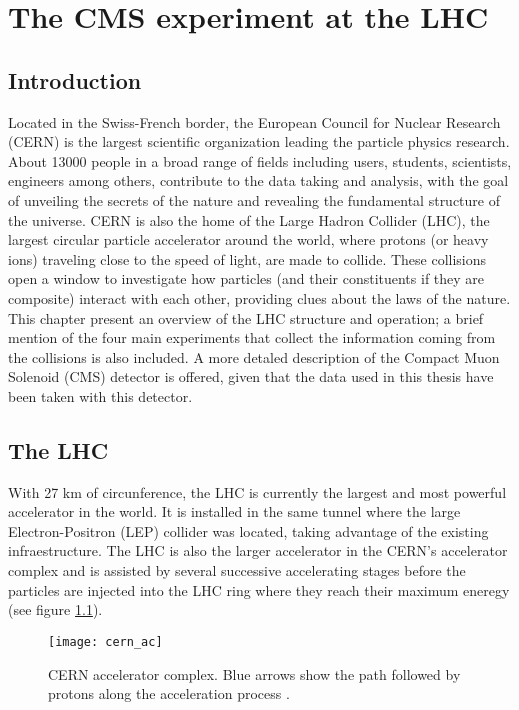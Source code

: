 \chapter{The CMS experiment at the LHC}\label{ch:cms}

\section{Introduction}\label{sec:cms_intro}
\noindent Located in the Swiss-French border, the European Council for Nuclear Research (CERN) is the largest scientific organization leading the particle physics research. About 13000 people in a broad range of fields including users, students, scientists, engineers among others, contribute to the data taking and analysis, with the goal of unveiling the secrets of the nature and revealing the fundamental structure of the universe. CERN is also the home of the Large Hadron Collider (LHC), the largest circular particle accelerator around the world, where protons (or heavy ions) traveling close to the speed of light, are made to collide. These collisions open a window to investigate how particles (and their constituents if they are composite) interact with each other, providing clues about the laws of the nature. This chapter present an overview of the LHC structure and operation; a brief mention of the four main experiments that collect the information coming from the collisions is also included. A more detaled description of the Compact Muon Solenoid (CMS) detector is offered, given that the data used in this thesis have been taken with this detector.     

\section{The LHC}

\noindent With 27 km of circunference, the LHC is currently the largest and most powerful accelerator in the world. It is installed in the same tunnel where the large Electron-Positron (LEP) collider was located, taking advantage of the existing infraestructure. The LHC is also the larger accelerator in the CERN's accelerator complex and is assisted by several successive accelerating stages before the particles are injected into the LHC ring where they reach their maximum eneregy (see figure \ref{fig:cern}).

\begin{figure}[!h]
  \centering
  \texttt{[image: cern\_ac]}
  \caption[CERN accelerator complex]{CERN accelerator complex. Blue arrows show the path followed by protons along the acceleration process \cite{cern}.}\label{fig:cern}
\end{figure}

